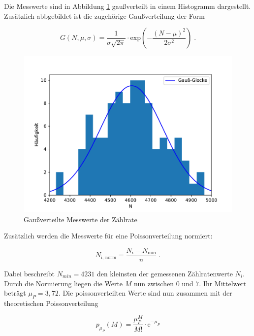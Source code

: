     Die Messwerte sind in Abbildung \ref{fig:plot5} gaußverteilt in einem Histogramm dargestellt.
    Zusätzlich abbgebildet ist die zugehörige Gaußverteilung der Form

    \begin{equation}
        G(N, \mu, \sigma) = \frac{1}{\sigma \sqrt{2 \pi}} \cdot \text{exp} 
                            \left(- \frac{(N - \mu)^2}{2 \sigma^2} \right) \; .
    \end{equation}

    \begin{figure} [H]
      \centering
      \includegraphics[scale=0.8]{content/gauss.pdf}
      \caption{Gaußverteilte Messwerte der Zählrate}
      \label{fig:plot5}
    \end{figure}


    Zusätzlich werden die Messwerte für eine Poissonverteilung normiert:

    \begin{equation}
        N_\text{i, norm} = \frac{N_i - N_\text{min}}{n} \; .
    \end{equation}

    Dabei beschreibt $N_{min} = 4231$ den kleinsten der gemessenen Zählratenwerte $N_i$.
    Durch die Normierung liegen die Werte $M$ nun zwischen $0$ und $7$.
    Ihr Mittelwert beträgt $\mu_P = 3,72$.
    Die poissonverteilten Werte sind nun zusammen mit der theoretischen Poissonverteilung

    \begin{equation}
        p_{\mu_P}(M) = \frac{\mu_P^M}{M!} \cdot \text{e}^{-\mu_P} 
    \end{equation}

